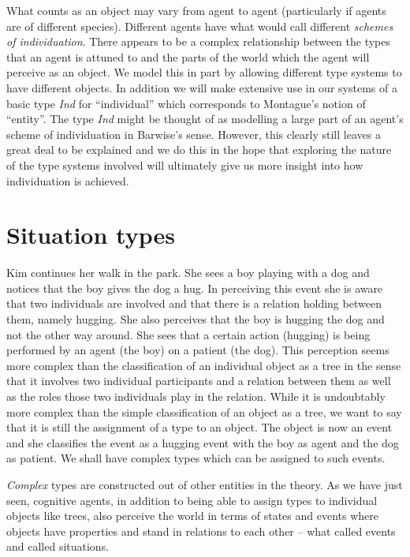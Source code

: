 What counts as an object may vary from agent to agent
(particularly if agents are of different species).  Different agents
have what \cite{Barwise1989} would call different \textit{schemes
  of individuation}.  There appears to be a complex relationship
between the types that an agent is attuned to and the parts of the
world which the agent will perceive as an object.  We model this in
part by allowing different type systems to have different
objects.  In addition we will make extensive use in our systems of a
basic type \textit{Ind} for ``individual'' which corresponds to
Montague's notion of ``entity''.  The type \textit{Ind} might be
thought of as modelling a large part of an agent's scheme of
individuation in Barwise's sense.  However, this clearly still leaves
a great deal to be explained and we do this in the hope that exploring the nature of the type
systems involved will ultimately give us more insight into how
individuation is achieved.


\section{Situation types}
\label{sec:sittypes}

Kim continues her walk in the park.  She sees a boy playing with a dog
and notices that the boy gives the dog a hug.  In perceiving this
event she is aware that two individuals are involved and that there is
a relation holding between them, namely hugging.  She also perceives
that the boy is hugging the dog and not the other way around.  She
sees that a certain action (hugging) is being performed by an agent
(the boy) on a patient (the dog).  This perception seems more complex
than the classification of an individual object as a tree in the sense
that it involves two individual participants and a relation between
them as well as the roles those two individuals play in the relation.
While it is undoubtably more complex than the simple classification of
an object as a tree, we want to say that it is still the assignment of
a type to an object.  The object is now an event and she classifies
the event as a hugging event with the boy as agent and the dog as
patient.  We shall have complex types which can be assigned to such events.

\textit{Complex} types are constructed out of
other entities in the theory.  As we have just seen,
cognitive agents, in addition to being able to assign types to
individual objects like trees, also perceive the world in terms of states and
events where objects have properties and stand in relations to each
other -- what \cite{Davidson1967} called events and
\cite{BarwisePerry1983} called situations.  

